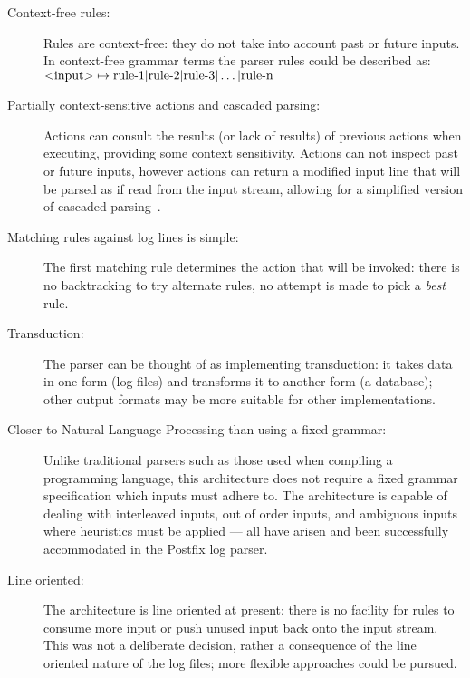 \documentclass[draft]{svmult}
\begin{document}
\begin{description}

    \item [Context-free rules:]  Rules are context-free: they do not take
        into account past or future inputs.  In context-free grammar terms
        the parser rules could be described as:
        $\text{\textless{}input\textgreater{}} \mapsto \text{rule-1} |
        \text{rule-2} | \text{rule-3} | \dots | \text{rule-n}$

    \item [Partially context-sensitive actions and cascaded parsing:]
        Actions can consult the results (or lack of results) of previous
        actions when executing, providing some context sensitivity.
        Actions can not inspect past or future inputs, however actions
        can return a modified input line that will be parsed as if read
        from the input stream, allowing for a simplified version of
        cascaded parsing~\cite{cascaded-parsing}.

    \item [Matching rules against log lines is simple:]  The first matching
        rule determines the action that will be invoked: there is no
        backtracking to try alternate rules, no attempt is made to pick a
        \textit{best\/} rule.

    \item [Transduction:]  The parser can be thought of as implementing
        transduction: it takes data in one form (log files) and transforms
        it to another form (a database); other output formats may be more
        suitable for other implementations.

    \item [Closer to Natural Language Processing than using a fixed
        grammar:] Unlike traditional parsers such as those used when
        compiling a programming language, this architecture does not
        require a fixed grammar specification which inputs must adhere to.
        The architecture is capable of dealing with interleaved inputs, out
        of order inputs, and ambiguous inputs where heuristics must be
        applied --- all have arisen and been successfully accommodated in
        the Postfix log parser.

    \item [Line oriented:]  The architecture is line oriented at present:
        there is no facility for rules to consume more input or push unused
        input back onto the input stream.  This was not a deliberate
        decision, rather a consequence of the line oriented nature of the
        log files; more flexible approaches could be pursued.

\end{description}
\end{document}
